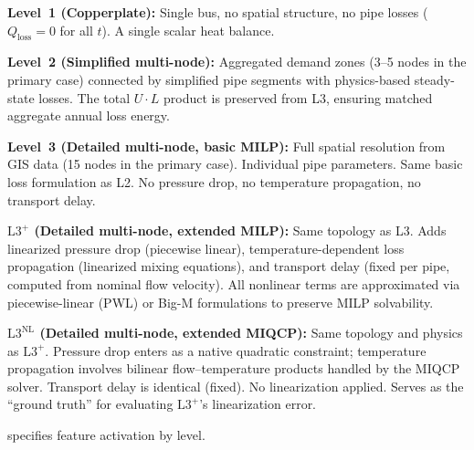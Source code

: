 \documentclass[review,3p]{elsarticle}
\newcommand{\Lplus}{\mathrm{L3}^{+}}
\newcommand{\Lnl}{\mathrm{L3}^{\mathrm{NL}}}
\begin{document}
\textbf{Level~1 (Copperplate):} Single bus, no spatial structure, no
pipe losses ($Q_{\mathrm{loss}}=0$ for all $t$). A single scalar heat
balance.

\textbf{Level~2 (Simplified multi-node):} Aggregated demand zones
(3--5 nodes in the primary case) connected by simplified pipe
segments with physics-based steady-state losses. The total
$U \cdot L$ product is preserved from L3, ensuring matched aggregate
annual loss energy.

\textbf{Level~3 (Detailed multi-node, basic MILP):} Full spatial
resolution from GIS data (15 nodes in the primary case). Individual
pipe parameters. Same basic loss formulation as L2. No pressure drop,
no temperature propagation, no transport delay.

\textbf{$\Lplus$ (Detailed multi-node, extended MILP):} Same
topology as L3. Adds linearized pressure drop (piecewise linear),
temperature-dependent loss propagation (linearized mixing equations),
and transport delay (fixed per pipe, computed from nominal flow
velocity). All nonlinear terms are approximated via piecewise-linear
(PWL) or Big-M formulations to preserve MILP solvability.

\textbf{$\Lnl$ (Detailed multi-node, extended MIQCP):} Same
topology and physics as $\Lplus$. Pressure drop enters as a native
quadratic constraint; temperature propagation involves bilinear
flow--temperature products handled by the MIQCP solver. Transport
delay is identical (fixed). No linearization applied. Serves as the
``ground truth'' for evaluating $\Lplus$'s linearization error.

 specifies feature activation by level.
\end{document}
